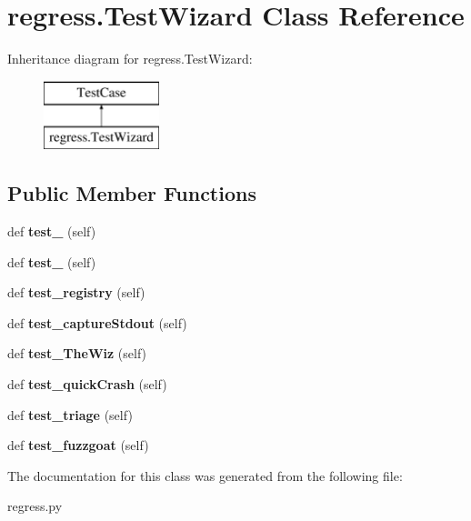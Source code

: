 \hypertarget{classregress_1_1_test_wizard}{}\section{regress.\+Test\+Wizard Class Reference}
\label{classregress_1_1_test_wizard}
Inheritance diagram for regress.\+Test\+Wizard\+:\begin{figure}[H]
\begin{center}
\leavevmode
\includegraphics[height=2.000000cm]{d9/d26/classregress_1_1_test_wizard}
\end{center}
\end{figure}
\subsection*{Public Member Functions}
\begin{DoxyCompactItemize}
\item 
\mbox{\label{classregress_1_1_test_wizard_aab5065b016607e241a1332d0957d1d29}} 
def {\bfseries test\+\_} (self)
\item 
\mbox{\label{classregress_1_1_test_wizard_aec34e8dbb90ed8727a52aa51ff81de1c}} 
def {\bfseries test\+\_} (self)
\item 
\mbox{\label{classregress_1_1_test_wizard_afcaf71bdf6e76925cd8306691e7eea3d}} 
def {\bfseries test\+\_\+registry} (self)
\item 
\mbox{\label{classregress_1_1_test_wizard_aaf29c9369124433377824e5395df1655}} 
def {\bfseries test\+\_\+capture\+Stdout} (self)
\item 
\mbox{\label{classregress_1_1_test_wizard_aa866af6baa8de387906e9dbe1c62aad1}} 
def {\bfseries test\+\_\+\+The\+Wiz} (self)
\item 
\mbox{\label{classregress_1_1_test_wizard_aba6155c151b7d8877f5305d1128c4513}} 
def {\bfseries test\+\_\+quick\+Crash} (self)
\item 
\mbox{\label{classregress_1_1_test_wizard_a765bffeb7f61561ab171a213c615f14a}} 
def {\bfseries test\+\_\+triage} (self)
\item 
\mbox{\label{classregress_1_1_test_wizard_a2979eb1da57abf1cec098d6b2aa1bc5f}} 
def {\bfseries test\+\_\+fuzzgoat} (self)
\end{DoxyCompactItemize}


The documentation for this class was generated from the following file\+:\begin{DoxyCompactItemize}
\item 
regress.\+py\end{DoxyCompactItemize}
